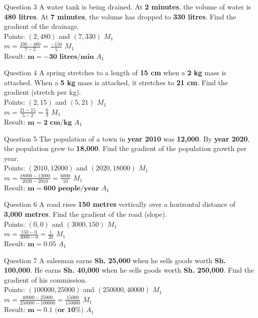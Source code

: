 \documentclass[12pt, a4paper, oneside]{article}
\begin{document}
\begin{solvingbox}{Question 3}
A water tank is being drained. At \textbf{2 minutes}, the volume of water is \textbf{480 litres}. At \textbf{7 minutes}, the volume has dropped to \textbf{330 litres}. Find the gradient of the drainage. \\
Points: $(2, 480)$ and $(7, 330)$ \hfill $M_1$ \\
$m = \frac{330 - 480}{7 - 2} = \frac{-150}{5}$ \hfill $M_1$ \\
Result: $\mathbf{m = -30\text{ litres/min}}$ \hfill $A_1$
\end{solvingbox}

\begin{solvingbox}{Question 4}
A spring stretches to a length of \textbf{15 cm} when a \textbf{2 kg} mass is attached. When a \textbf{5 kg} mass is attached, it stretches to \textbf{21 cm}. Find the gradient (stretch per kg). \\
Points: $(2, 15)$ and $(5, 21)$ \hfill $M_1$ \\
$m = \frac{21 - 15}{5 - 2} = \frac{6}{3}$ \hfill $M_1$ \\
Result: $\mathbf{m = 2\text{ cm/kg}}$ \hfill $A_1$
\end{solvingbox}

\begin{solvingbox}{Question 5}
The population of a town in \textbf{year 2010} was \textbf{12,000}. By \textbf{year 2020}, the population grew to \textbf{18,000}. Find the gradient of the population growth per year. \\
Points: $(2010, 12000)$ and $(2020, 18000)$ \hfill $M_1$ \\
$m = \frac{18000 - 12000}{2020 - 2010} = \frac{6000}{10}$ \hfill $M_1$ \\
Result: $\mathbf{m = 600\text{ people/year}}$ \hfill $A_1$
\end{solvingbox}

\begin{solvingbox}{Question 6}
A road rises \textbf{150 metres} vertically over a horizontal distance of \textbf{3,000 metres}. Find the gradient of the road (slope). \\
Points: $(0, 0)$ and $(3000, 150)$ \hfill $M_1$ \\
$m = \frac{150 - 0}{3000 - 0} = \frac{1}{20}$ \hfill $M_1$ \\
Result: $\mathbf{m = 0.05}$ \hfill $A_1$
\end{solvingbox}

\begin{solvingbox}{Question 7}
A salesman earns \textbf{Sh. 25,000} when he sells goods worth \textbf{Sh. 100,000}. He earns \textbf{Sh. 40,000} when he sells goods worth \textbf{Sh. 250,000}. Find the gradient of his commission. \\
Points: $(100000, 25000)$ and $(250000, 40000)$ \hfill $M_1$ \\
$m = \frac{40000 - 25000}{250000 - 100000} = \frac{15000}{150000}$ \hfill $M_1$ \\
Result: $\mathbf{m = 0.1 \text{ (or } 10\%)}$ \hfill $A_1$
\end{solvingbox}
\end{document}
